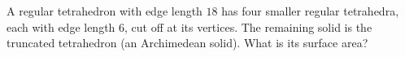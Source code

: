 A regular tetrahedron with edge length $18$ has four smaller regular tetrahedra, each with edge length $6$, cut off at its vertices. The remaining solid is the truncated tetrahedron (an Archimedean solid). What is its surface area?
